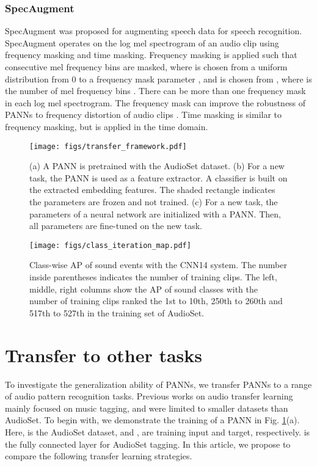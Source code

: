 \documentclass[journal]{IEEEtran}
\begin{document}
\subsubsection{SpecAugment}
SpecAugment \cite{park2019specaugment} was proposed for augmenting speech data for speech recognition. SpecAugment operates on the log mel spectrogram of an audio clip using frequency masking and time masking. Frequency masking is applied such that  consecutive mel frequency bins  are masked, where  is chosen from a uniform distribution from 0 to a frequency mask parameter , and  is chosen from , where  is the number of mel frequency bins \cite{park2019specaugment}. There can be more than one frequency mask in each log mel spectrogram. The frequency mask can improve the robustness of PANNs to frequency distortion of audio clips \cite{park2019specaugment}. Time masking is similar to frequency masking, but is applied in the time domain.

\begin{figure}[t]
  \centering
  \centerline{\texttt{[image: figs/transfer\_framework.pdf]}}
  \caption{(a) A PANN is pretrained with the AudioSet dataset. (b) For a new task, the PANN is used as a feature extractor. A classifier is built on the extracted embedding features. The shaded rectangle indicates the parameters are frozen and not trained. (c) For a new task, the parameters of a neural network are initialized with a PANN. Then, all parameters are fine-tuned on the new task.}
  \label{fig:transfer_framework}
\end{figure}

\begin{figure*}[t]
  \centering
  \centerline{\texttt{[image: figs/class\_iteration\_map.pdf]}}
  \caption{Class-wise AP of sound events with the CNN14 system. The number inside parentheses indicates the number of training clips. The left, middle, right columns show the AP of sound classes with the number of training clips ranked the 1st to 10th, 250th to 260th and 517th to 527th in the training set of AudioSet.}
  \label{fig:class_iteration_map}
\end{figure*}


\section{Transfer to other tasks}\label{section:transfer}
To investigate the generalization ability of PANNs, we transfer PANNs to a range of audio pattern recognition tasks. Previous works on audio transfer learning \cite{van2014transfer}\cite{choi2017transfer}\cite{wang2018polyphonic}\cite{pons2019musicnn}\cite{law2009input} mainly focused on music tagging, and were limited to smaller datasets than AudioSet. To begin with, we demonstrate the training of a PANN in Fig. \ref{fig:transfer_framework}(a). Here,  is the AudioSet dataset, and ,  are training input and target, respectively.  is the fully connected layer for AudioSet tagging. In this article, we propose to compare the following transfer learning strategies. 
\end{document}

